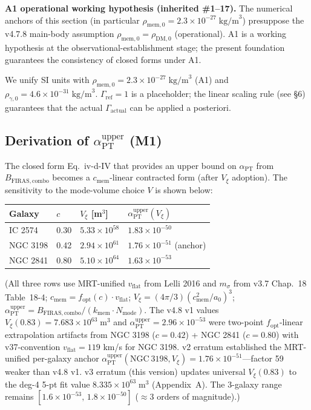 \documentclass[11pt,a4paper]{article}
\newcommand{\cmem}{c_{\mathrm{mem}}}
\newcommand{\Vxi}{V_{\xi}}
\newcommand{\aPT}{\alpha_{\mathrm{PT}}}
\newcommand{\rhomem}{\rho_{\mathrm{mem},0}}
\newcommand{\rhog}{\rho_{\gamma,0}}
\newcommand{\BFIRAS}{B_{\mathrm{FIRAS,combo}}}
\newcommand{\Gammaref}{\Gamma_{\mathrm{ref}}}
\newcommand{\Gammaact}{\Gamma_{\mathrm{actual}}}
\newcommand{\msigma}{m_{\sigma}}
\newcommand{\vflat}{v_{\mathrm{flat}}}
\newcommand{\fopt}{f_{\mathrm{opt}}}
\begin{document}
\begin{notebox}
\textbf{A1 operational working hypothesis (inherited \#1--17).}
The numerical anchors of this section (in particular $\rhomem = 2.3 \times 10^{-27}\;\mathrm{kg/m}^3$)
presuppose the v4.7.8 main-body assumption $\rhomem = \rho_{\mathrm{DM},0}$ (operational). A1 is a
working hypothesis at the observational-establishment stage; the present foundation guarantees the
consistency of closed forms under A1.
\end{notebox}

We unify SI units with $\rhomem = 2.3 \times 10^{-27}\;\mathrm{kg/m}^3$ (A1) and
$\rhog = 4.6 \times 10^{-31}\;\mathrm{kg/m}^3$. $\Gammaref = 1$ is a placeholder; the linear scaling
rule (see \S 6) guarantees that the actual $\Gammaact$ can be applied a posteriori.

\subsection{Derivation of $\aPT^{\mathrm{upper}}$ (M1)}
The closed form Eq.~iv-d-IV that provides an upper bound on $\aPT$ from $\BFIRAS$ becomes a
$\cmem$-linear contracted form (after $\Vxi$ adoption). The sensitivity to the mode-volume choice
$V$ is shown below:

\begin{center}\small
\begin{tabular}{@{}llll@{}}
\toprule
Galaxy & $c$ & $\Vxi$ [m$^3$] & $\aPT^{\mathrm{upper}}(\Vxi)$ \\
\midrule
IC 2574  & 0.30 & $5.33 \times 10^{58}$ & $1.83 \times 10^{-50}$ \\
NGC 3198 & 0.42 & $2.94 \times 10^{61}$ & $1.76 \times 10^{-51}$ (anchor) \\
NGC 2841 & 0.80 & $5.10 \times 10^{64}$ & $1.63 \times 10^{-53}$ \\
\bottomrule
\end{tabular}
\end{center}
\footnotesize
(All three rows use MRT-unified $\vflat$ from Lelli 2016 and $\msigma$ from v3.7 Chap.~18
Table~18-4; $c_{\mathrm{mem}} = \fopt(c)\cdot\vflat$; $V_\xi = (4\pi/3)(c_{\mathrm{mem}}^2/a_0)^3$;
$\alpha_{\mathrm{PT}}^{\mathrm{upper}} = \BFIRAS/(k_{\mathrm{mem}}\cdot N_{\mathrm{mode}})$.
The v4.8 v1 values $V_\xi(0.83) = 7.683\times10^{63}\;\mathrm{m}^3$ and
$\aPT^{\mathrm{upper}} = 2.96\times10^{-53}$ were two-point $\fopt$-linear extrapolation artifacts from
NGC 3198 ($c=0.42$) + NGC 2841 ($c=0.80$) with v37-convention $\vflat=119$ km/s for NGC 3198.
v2 erratum established the MRT-unified per-galaxy anchor
$\aPT^{\mathrm{upper}}(\mathrm{NGC~3198}, V_\xi) = 1.76\times10^{-51}$---factor 59 weaker
than v4.8 v1. v3 erratum (this version) updates universal $\Vxi(0.83)$ to the deg-4 5-pt fit value
$8.335\times10^{63}\;\mathrm{m}^3$ (Appendix~A). The 3-galaxy range remains
$[1.6\times10^{-53},\, 1.8\times10^{-50}]$ ($\approx$3 orders of magnitude).)
\normalsize
\end{document}
